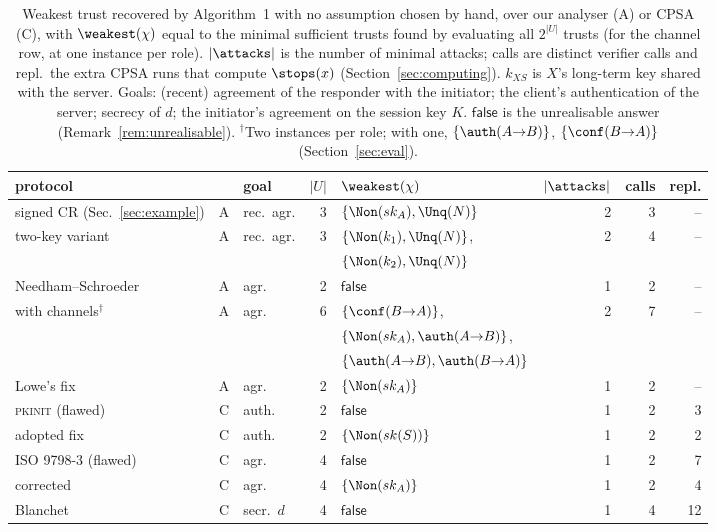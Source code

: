 \begin{table}[t]
\caption{Weakest trust recovered by Algorithm~1 with no assumption chosen by hand, over
our analyser (A) or CPSA (C), with $\weakest(\chi)$ equal to the minimal sufficient trusts
found by evaluating all $2^{|U|}$ trusts (for the channel row, at one instance per role). $|\attacks|$ is the number
of minimal attacks; calls are distinct verifier calls and repl.\ the extra CPSA runs
that compute $\stops(x)$ (Section~\ref{sec:computing}). $k_{XS}$ is $X$'s long-term key
shared with the server. Goals: (recent) agreement of the responder with the
initiator; the client's authentication of the server; secrecy of $d$; the
initiator's agreement on the session key $K$. $\mathsf{false}$ is the unrealisable answer
(Remark~\ref{rem:unrealisable}). $^{\dagger}$Two instances per role; with one,
$\{\auth(A{\to}B)\}$, $\{\conf(B{\to}A)\}$ (Section~\ref{sec:eval}).}
\label{tab:results}
\centering
\setlength{\tabcolsep}{1.6pt}
\footnotesize
\begin{tabular}{lcl r l r r r}
\toprule
protocol & & goal & $|U|$ & $\weakest(\chi)$ & $|\attacks|$ & calls & repl.\\
\midrule
signed CR (Sec.~\ref{sec:example}) & A & rec.\ agr. & 3 & $\{\Non(sk_A), \Unq(N)\}$ & 2 & 3 & --\\
\quad two-key variant & A & rec.\ agr. & 3 & $\{\Non(k_1), \Unq(N)\}$, & 2 & 4 & --\\
 & & & & \quad $\{\Non(k_2), \Unq(N)\}$ & & & \\
Needham--Schroeder & A & agr. & 2 & $\mathsf{false}$ & 1 & 2 & --\\
\quad with channels$^{\dagger}$ & A & agr. & 6 & $\{\conf(B{\to}A)\}$, & 2 & 7 & --\\
 & & & & \quad $\{\Non(sk_A), \auth(A{\to}B)\}$, & & & \\
 & & & & \quad $\{\auth(A{\to}B), \auth(B{\to}A)\}$ & & & \\
\quad Lowe's fix & A & agr. & 2 & $\{\Non(sk_A)\}$ & 1 & 2 & --\\
\textsc{pkinit} (flawed) & C & auth. & 2 & $\mathsf{false}$ & 1 & 2 & 3\\
\quad adopted fix & C & auth. & 2 & $\{\Non(sk(S))\}$ & 1 & 2 & 2\\
ISO 9798-3 (flawed) & C & agr. & 4 & $\mathsf{false}$ & 1 & 2 & 7\\
\quad corrected & C & agr. & 4 & $\{\Non(sk_A)\}$ & 1 & 2 & 4\\
Blanchet & C & secr.\ $d$ & 4 & $\mathsf{false}$ & 1 & 4 & 12\\

\end{tabular}
\end{table}
